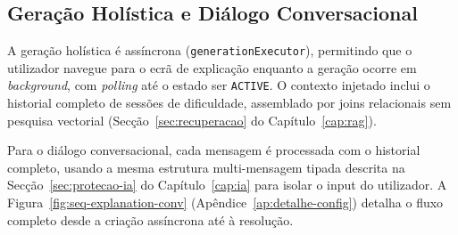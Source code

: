 \subsection*{Geração Holística e Diálogo Conversacional}

A geração holística é assíncrona (\texttt{generationExecutor}), permitindo que o utilizador navegue para o ecrã de explicação enquanto a geração ocorre em \textit{background}, com \textit{polling} até o estado ser \texttt{ACTIVE}. O contexto injetado inclui o historial completo de sessões de dificuldade, assemblado por joins relacionais sem pesquisa vectorial (Secção~\ref{sec:recuperacao} do Capítulo~\ref{cap:rag}).

Para o diálogo conversacional, cada mensagem é processada com o historial completo, usando a mesma estrutura multi-mensagem tipada descrita na Secção~\ref{sec:protecao-ia} do Capítulo~\ref{cap:ia} para isolar o input do utilizador.
A Figura~\ref{fig:seq-explanation-conv} (Apêndice~\ref{ap:detalhe-config}) detalha o fluxo completo desde a criação assíncrona até à resolução.

